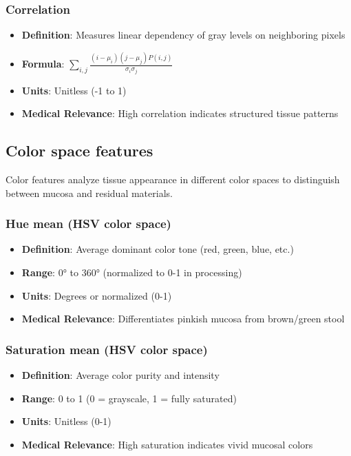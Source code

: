 \documentclass[11pt]{article}
\begin{document}
\subsubsection{Correlation}
\begin{itemize}
    \item \textbf{Definition}: Measures linear dependency of gray levels on neighboring pixels
    \item \textbf{Formula}: $\displaystyle \sum_{i,j} \frac{(i-\mu_i)(j-\mu_j)P(i,j)}{\sigma_i\sigma_j}$
    \item \textbf{Units}: Unitless (-1 to 1)
    \item \textbf{Medical Relevance}: High correlation indicates structured tissue patterns
\end{itemize}

\subsection{Color space features}

Color features analyze tissue appearance in different color spaces to distinguish between mucosa and residual materials.

\subsubsection{Hue mean (HSV color space)}
\begin{itemize}
    \item \textbf{Definition}: Average dominant color tone (red, green, blue, etc.)
    \item \textbf{Range}: 0° to 360° (normalized to 0-1 in processing)
    \item \textbf{Units}: Degrees or normalized (0-1)
    \item \textbf{Medical Relevance}: Differentiates pinkish mucosa from brown/green stool
\end{itemize}

\subsubsection{Saturation mean (HSV color space)}
\begin{itemize}
    \item \textbf{Definition}: Average color purity and intensity
    \item \textbf{Range}: 0 to 1 (0 = grayscale, 1 = fully saturated)
    \item \textbf{Units}: Unitless (0-1)
    \item \textbf{Medical Relevance}: High saturation indicates vivid mucosal colors
\end{itemize}
\end{document}
